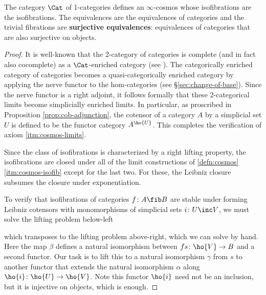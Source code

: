 \begin{proposition}\label{prop:cat-cosmos}
 The category $\Cat$ of 1-cat\-e\-go\-ri\-es defines an $\infty$-cosmos whose isofibrations are the isofibrations.
The equivalences are the equivalences of categories and the trivial fibrations are \textbf{surjective equivalences}: equivalences of categories that are also surjective on objects.
\end{proposition}
\begin{proof}
It is well-known that the 2-category of categories is complete (and in fact also cocomplete) as a $\Cat$-enriched category (see %
  \cite{Kelly:1989eo}). The categorically enriched category of categories becomes a quasi-categorically enriched category by applying the nerve functor to the hom-categories (see \S\ref{sec:change-of-base}). Since the nerve functor is a right adjoint, it follows formally that these 2-categorical limits become simplicially enriched limits. In particular, as proscribed in Proposition \ref{prop:cob-adjunction}, the cotensor of a category $A$ by a simplicial set $U$ is defined to be the functor category $A^{\ho{U}}$. This completes the verification of axiom \ref{itm:cosmos-limits}.

Since the class of isofibrations is characterized by a right lifting property, %
  the isofibrations are closed under all of the limit constructions of  \ref{defn:cosmos}\ref{itm:cosmos-isofib} except for the last two. %
  For these, the Leibniz closure subsumes the closure under exponentiation.

To verify that isofibrations of categories $f \colon A \fib B$ are stable under forming Leibniz cotensors with monomorphisms of simplicial sets $i \colon U \inc V$, we must solve the lifting problem below-left
\begin{center}
\end{center}
which transposes to the lifting problem above-right, which we can solve by hand. Here the map $\beta$ defines a natural isomorphism between $fs \colon \ho{V} \to B$ and a second functor. Our task is to lift this to a natural isomorphism $\gamma$ from $s$ to another functor that extends the natural isomorphism $\alpha$ along $\ho{i} \colon \ho{U} \to \ho{V}$. Note this functor $\ho{i}$ need not be an inclusion, but it is injective on objects, which is enough.


\end{proof}
